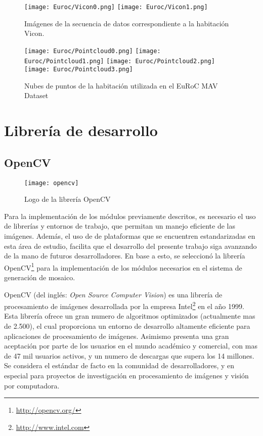 \begin{figure}[H]
	\centering
	\texttt{[image: Euroc/Vicon0.png]}
	\texttt{[image: Euroc/Vicon1.png]}
	\caption{Imágenes de la secuencia de datos correspondiente a la habitación Vicon.}
	\label{fig:vicon}
\end{figure}


\begin{figure}[H]
	\centering
	\texttt{[image: Euroc/Pointcloud0.png]}
	\texttt{[image: Euroc/Pointcloud1.png]}
	\texttt{[image: Euroc/Pointcloud2.png]}
	\texttt{[image: Euroc/Pointcloud3.png]}
	\caption{Nubes de puntos de la habitación utilizada en el EuRoC MAV Dataset}
	\label{fig:pointcloudEuroc}
\end{figure}



\section{Librería de desarrollo}

\subsection{OpenCV}

\begin{wrapfigure}{R}{5cm}
	\begin{center}
		\vspace*{-0.2in}
		\texttt{[image: opencv]}
	\end{center}
	\caption{Logo de la librería OpenCV}
\end{wrapfigure}

Para la implementación de los módulos previamente descritos, es necesario el uso de librerías y entornos de trabajo, que permitan un manejo eficiente de las imágenes. Además, el uso de de plataformas que se encuentren estandarizadas en esta área de estudio, facilita que el desarrollo del presente trabajo siga avanzando de la mano de futuros desarrolladores. En base a esto, se seleccionó la librería OpenCV\footnote{\url{http://opencv.org/}} para la implementación de los módulos necesarios en el sistema de generación de mosaico.

OpenCV (del inglés: \textit{Open Source Computer Vision}) es una librería de procesamiento de imágenes desarrollada por la empresa Intel\footnote{\url{http://www.intel.com}} en el año 1999. Esta librería ofrece un gran numero de algoritmos optimizados (actualmente mas de 2.500), el cual proporciona un entorno de desarrollo altamente eficiente para aplicaciones de procesamiento de imágenes. Asimismo presenta una gran aceptación por parte de los usuarios en el mundo académico y comercial, con mas de 47 mil usuarios activos, y un numero de descargas que supera los 14 millones. Se considera el estándar de facto en la comunidad de desarrolladores, y en especial para proyectos de investigación en procesamiento de imágenes y visión por computadora. 

